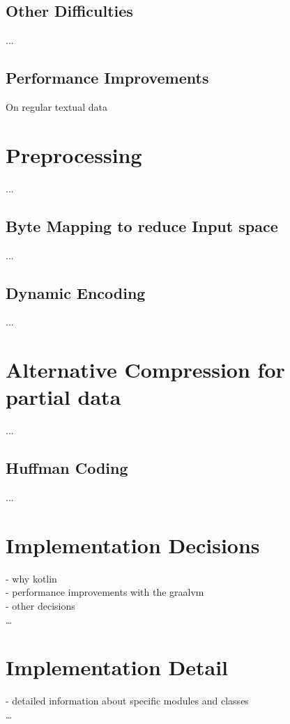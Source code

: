 \subsection{Other Difficulties}
...

\subsection{Performance Improvements}
On regular textual data 

\section{Preprocessing}
\label{ch:Conceptual Design:sec:Preprocessing}
...
\subsection{Byte Mapping to reduce Input space}
...
\subsection{Dynamic Encoding}
...

\section{Alternative Compression for partial data}
\label{ch:Conceptual Design:sec:Alternative Encoding}
...
\subsection{Huffman Coding}
...

\section{Implementation Decisions}
\label{ch:Conceptual Design:sec:Implementation Decisions}
- why kotlin\\
- performance improvements with the graalvm\\
- other decisions\\
\ldots

\section{Implementation Detail}
\label{ch:Conceptual Design:sec:Implementation Detail}
- detailed information about specific modules and classes\\
\ldots


